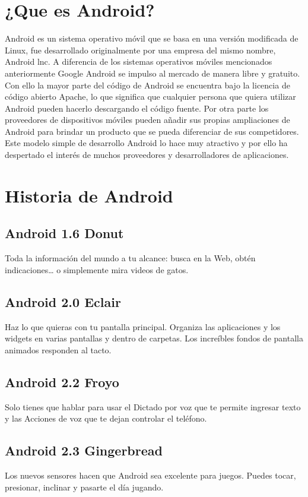 \documentclass[letterpaper,12pt,openany,oneside]{book}
\begin{document}
\section{¿Que es Android?}
Android es un sistema operativo móvil que se basa en una versión modificada de Linux,
fue desarrollado originalmente por una empresa del mismo nombre, Android lnc.
A diferencia de los sistemas operativos móviles mencionados anteriormente Google Android se impulso al mercado de manera libre y gratuito. Con ello la mayor parte del
código de Android se encuentra bajo la licencia de código abierto Apache, lo que significa
que cualquier persona que quiera utilizar Android pueden hacerlo descargando el código
fuente. Por otra parte los proveedores de dispositivos móviles pueden añadir sus propias
ampliaciones de Android para brindar un producto que se pueda diferenciar de sus competidores. Este modelo simple de desarrollo Android lo hace muy atractivo y por ello ha
despertado el interés de muchos proveedores y desarrolladores de aplicaciones.
\section{Historia de Android}

\subsection{Android 1.6 Donut}
Toda la información del mundo a tu alcance: busca en la Web, obtén indicaciones… o simplemente mira videos de gatos.
\subsection{Android 2.0 Eclair}
Haz lo que quieras con tu pantalla principal. Organiza las aplicaciones y los widgets en varias pantallas y dentro de carpetas. Los increíbles fondos de pantalla animados responden al tacto.
\subsection{Android 2.2 Froyo}
Solo tienes que hablar para usar el Dictado por voz que te permite ingresar texto y las Acciones de voz que te dejan controlar el teléfono.
\subsection{Android 2.3 Gingerbread}
Los nuevos sensores hacen que Android sea excelente para juegos. Puedes tocar, presionar, inclinar y pasarte el día jugando.
\end{document}
